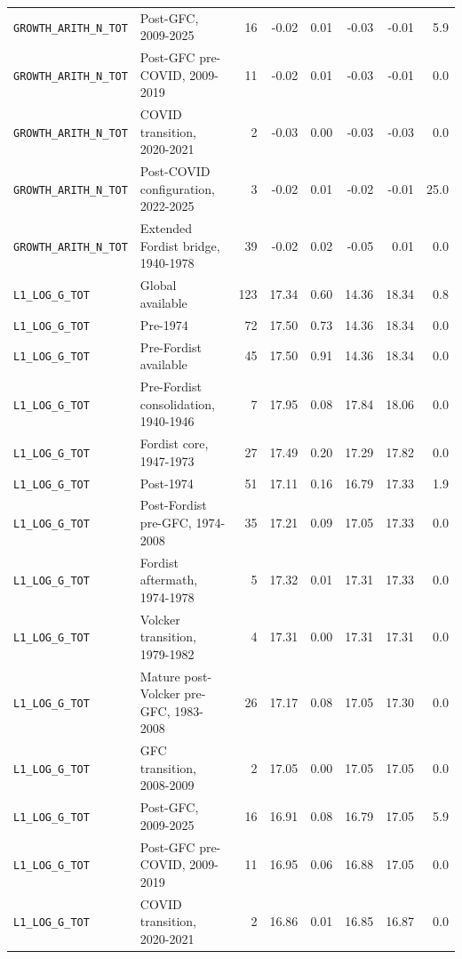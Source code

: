 \begin{landscape}
\begin{longtable}{p{4.4cm}p{3.8cm}rrrrrr}
\nolinkurl{GROWTH_ARITH_N_TOT} & Post-GFC, 2009-2025 & 16 & -0.02 & 0.01 & -0.03 & -0.01 & 5.9
\\
\nolinkurl{GROWTH_ARITH_N_TOT} & Post-GFC pre-COVID, 2009-2019 & 11 & -0.02 & 0.01 & -0.03 & -0.01 & 0.0
\\
\nolinkurl{GROWTH_ARITH_N_TOT} & COVID transition, 2020-2021 & 2 & -0.03 & 0.00 & -0.03 & -0.03 & 0.0
\\
\nolinkurl{GROWTH_ARITH_N_TOT} & Post-COVID configuration, 2022-2025 & 3 & -0.02 & 0.01 & -0.02 & -0.01 & 25.0
\\
\nolinkurl{GROWTH_ARITH_N_TOT} & Extended Fordist bridge, 1940-1978 & 39 & -0.02 & 0.02 & -0.05 & 0.01 & 0.0
\\
\nolinkurl{L1_LOG_G_TOT} & Global available & 123 & 17.34 & 0.60 & 14.36 & 18.34 & 0.8
\\
\nolinkurl{L1_LOG_G_TOT} & Pre-1974 & 72 & 17.50 & 0.73 & 14.36 & 18.34 & 0.0
\\
\nolinkurl{L1_LOG_G_TOT} & Pre-Fordist available & 45 & 17.50 & 0.91 & 14.36 & 18.34 & 0.0
\\
\nolinkurl{L1_LOG_G_TOT} & Pre-Fordist consolidation, 1940-1946 & 7 & 17.95 & 0.08 & 17.84 & 18.06 & 0.0
\\
\nolinkurl{L1_LOG_G_TOT} & Fordist core, 1947-1973 & 27 & 17.49 & 0.20 & 17.29 & 17.82 & 0.0
\\
\nolinkurl{L1_LOG_G_TOT} & Post-1974 & 51 & 17.11 & 0.16 & 16.79 & 17.33 & 1.9
\\
\nolinkurl{L1_LOG_G_TOT} & Post-Fordist pre-GFC, 1974-2008 & 35 & 17.21 & 0.09 & 17.05 & 17.33 & 0.0
\\
\nolinkurl{L1_LOG_G_TOT} & Fordist aftermath, 1974-1978 & 5 & 17.32 & 0.01 & 17.31 & 17.33 & 0.0
\\
\nolinkurl{L1_LOG_G_TOT} & Volcker transition, 1979-1982 & 4 & 17.31 & 0.00 & 17.31 & 17.31 & 0.0
\\
\nolinkurl{L1_LOG_G_TOT} & Mature post-Volcker pre-GFC, 1983-2008 & 26 & 17.17 & 0.08 & 17.05 & 17.30 & 0.0
\\
\nolinkurl{L1_LOG_G_TOT} & GFC transition, 2008-2009 & 2 & 17.05 & 0.00 & 17.05 & 17.05 & 0.0
\\
\nolinkurl{L1_LOG_G_TOT} & Post-GFC, 2009-2025 & 16 & 16.91 & 0.08 & 16.79 & 17.05 & 5.9
\\
\nolinkurl{L1_LOG_G_TOT} & Post-GFC pre-COVID, 2009-2019 & 11 & 16.95 & 0.06 & 16.88 & 17.05 & 0.0
\\
\nolinkurl{L1_LOG_G_TOT} & COVID transition, 2020-2021 & 2 & 16.86 & 0.01 & 16.85 & 16.87 & 0.0

\end{longtable}
\end{landscape}
